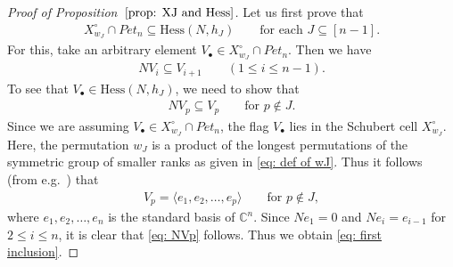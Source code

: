 \begin{proof}[Proof of Proposition~$\ref{prop: XJ and Hess}$]
Let us first prove that 
\begin{align}\label{eq: first inclusion}
 X^{\circ}_{w_J}\cap Pet_{n} \subseteq \text{Hess}(N,h_J)
 \qquad \text{for each $J\subseteq [n-1]$}.
\end{align}
For this, take an arbitrary element $V_{\bullet}\in X^{\circ}_{w_J}\cap Pet_{n}$. Then we have
\begin{align*}
 NV_i \subseteq V_{i+1} \qquad (1\le i\le n-1).
\end{align*}
To see that $V_{\bullet}\in \text{Hess}(N,h_J)$, we need to show that 
\begin{align}\label{eq: NVp}
 NV_p \subseteq V_{p} \qquad \text{for }p\notin J.
\end{align}
Since we are assuming $V_{\bullet}\in X^{\circ}_{w_J}\cap Pet_{n}$, the flag $V_{\bullet}$ lies in the Schubert cell $X^{\circ}_{w_J}$. Here, the permutation $w_J$ is a product of the longest permutations of the symmetric group of smaller ranks as given in \eqref{eq: def of wJ}. Thus it follows (from e.g.~\cite[Sect.~10.2]{fult97}) that 
\begin{align*}
 V_p 
 = 
 \langle e_{1}, e_{2}, \ldots, e_{p}\rangle
 \qquad \text{for }p\notin J ,
\end{align*}
where $e_1,e_2,\ldots,e_n$ is the standard basis of ${\mathbb C}^n$. Since $Ne_1 =0$ and $Ne_i =e_{i-1}$ for~$2\le i\le n$, it is clear that \eqref{eq: NVp} follows. Thus we obtain \eqref{eq: first inclusion}.


\end{proof}

